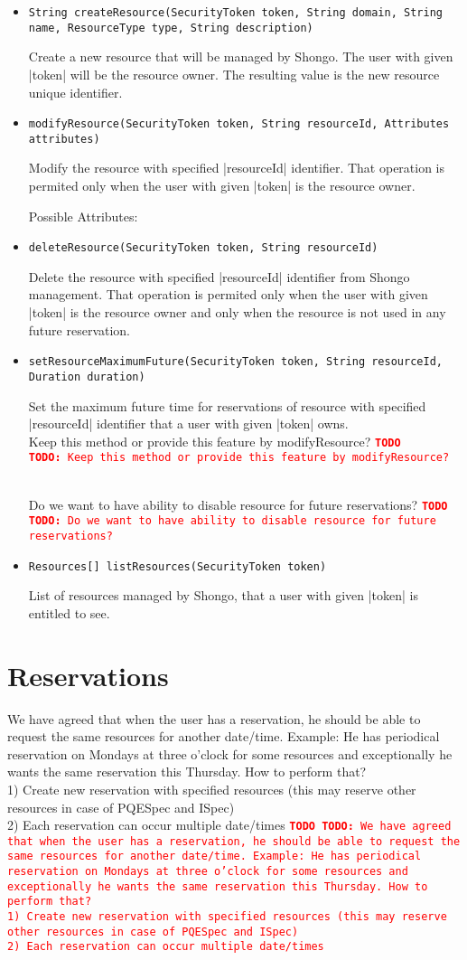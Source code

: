 \documentclass[a4paper]{report}
\newcommand{\APIcmd}[1]{%
\item \lstinline[style=myinline]!#1!%

}
\newenvironment{APIdef}{\begin{itemize}}{\end{itemize}}
\newcommand{\TODO}[1]{%
\def\empty{}%
\def\prvniparametr{#1}%
\ifx\prvniparametr\empty%
\begingroup\tt\textcolor{red}{\noindent\textbf{TODO}}\endgroup
\else%
\begingroup\tt\textcolor{red}{\noindent\textbf{TODO:}\ #1}\endgroup
\fi%
}
\begin{document}
\begin{APIdef}

\APIcmd{String createResource(SecurityToken token, String domain, String name, ResourceType type, String description)}
Create a new resource that will be managed by Shongo. The user with given |token| will be the resource owner. The resulting value is the new resource unique identifier.

\APIcmd{modifyResource(SecurityToken token, String resourceId, Attributes attributes)}
Modify the resource with specified |resourceId| identifier. That operation is permited only when the user with given |token| is the resource owner.

Possible Attributes:

\APIcmd{deleteResource(SecurityToken token, String resourceId)}
Delete the resource with specified |resourceId| identifier from Shongo management. That operation is permited only when the user with given |token| is the resource owner and only when the resource is not used in any future reservation.

\APIcmd{setResourceMaximumFuture(SecurityToken token, String resourceId, Duration duration)}
Set the maximum future time for reservations of resource with specified |resourceId| identifier that a user with given |token| owns.
\\ \TODO{Keep this method or provide this feature by modifyResource?}
\\ \TODO{Do we want to have ability to disable resource for future reservations?}

\APIcmd{Resources[] listResources(SecurityToken token)}
List of resources managed by Shongo, that a user with given |token| is entitled to see.

\end{APIdef}


\section{Reservations}

\TODO{We have agreed that when the user has a reservation, he should be able to request the same resources for another date/time. Example: He has periodical reservation on Mondays at three o'clock for some resources and exceptionally he wants the same reservation this Thursday. How to perform that? 
\\ 1) Create new reservation with specified resources (this may reserve other resources in case of PQESpec and ISpec)
\\ 2) Each reservation can occur multiple date/times
}
\end{document}
